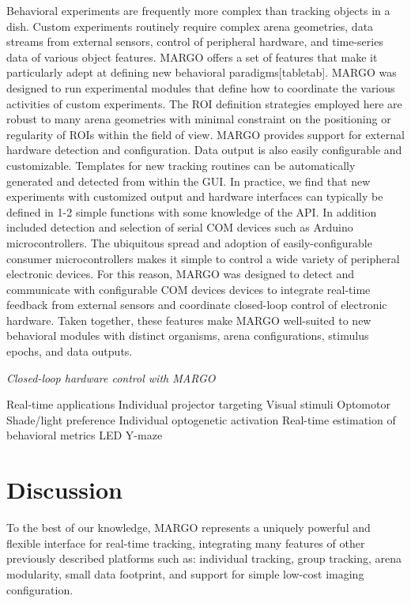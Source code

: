 \documentclass[10pt]{article}
\begin{document}
\begin{multicols}{2}
Behavioral experiments are frequently more complex than tracking objects in a dish. Custom experiments routinely require complex arena geometries, data streams from external sensors, control of peripheral hardware, and time-series data of various object features. MARGO offers a set of features that make it particularly adept at defining new behavioral paradigms[tabletab]. MARGO was designed to run experimental modules that define how to coordinate the various activities of custom experiments. The ROI definition strategies employed here are robust to many arena geometries with minimal constraint on the positioning or regularity of ROIs within the field of view. MARGO provides support for external hardware detection and configuration. Data output is also easily configurable and customizable. Templates for new tracking routines can be automatically generated and detected from within the GUI. In practice, we find that new experiments with customized output and hardware interfaces can typically be defined in 1-2 simple functions with some knowledge of the API. In addition included detection and selection of serial COM devices such as Arduino microcontrollers. The ubiquitous spread and adoption of easily-configurable consumer microcontrollers makes it simple to control a wide variety of peripheral electronic devices. For this reason, MARGO was designed to detect and communicate with configurable COM devices devices to integrate real-time feedback from external sensors and coordinate closed-loop control of electronic hardware. Taken together, these features make MARGO well-suited to new behavioral modules with distinct organisms, arena configurations, stimulus epochs, and data outputs.


\textit{Closed-loop hardware control with MARGO}


Real-time applications
Individual projector targeting
Visual stimuli
Optomotor
Shade/light preference
Individual optogenetic activation
Real-time estimation of behavioral metrics
LED Y-maze

\section{Discussion}

To the best of our knowledge, MARGO represents a uniquely powerful and flexible interface for real-time tracking, integrating many features of other previously described platforms such as: individual tracking, group tracking, arena modularity, small data footprint, and support for simple low-cost imaging configuration.


\end{multicols}
\end{document}
